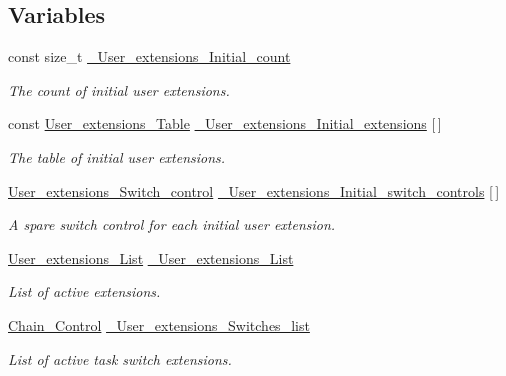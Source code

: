 \subsection*{Variables}
\begin{DoxyCompactItemize}
\item 
const size\+\_\+t \mbox{\hyperlink{group__RTEMSScoreUserExt_gae8c91b09bd26a5a7eae930202395a01b}{\+\_\+\+User\+\_\+extensions\+\_\+\+Initial\+\_\+count}}
\begin{DoxyCompactList}\small\item\em The count of initial user extensions. \end{DoxyCompactList}\item 
const \mbox{\hyperlink{structUser__extensions__Table}{User\+\_\+extensions\+\_\+\+Table}} \mbox{\hyperlink{group__RTEMSScoreUserExt_gafe277338e657c6fd563384012bc0e23c}{\+\_\+\+User\+\_\+extensions\+\_\+\+Initial\+\_\+extensions}} \mbox{[}$\,$\mbox{]}
\begin{DoxyCompactList}\small\item\em The table of initial user extensions. \end{DoxyCompactList}\item 
\mbox{\hyperlink{structUser__extensions__Switch__control}{User\+\_\+extensions\+\_\+\+Switch\+\_\+control}} \mbox{\hyperlink{group__RTEMSScoreUserExt_ga8a3af974c302d7af8bca9ecf85ac8149}{\+\_\+\+User\+\_\+extensions\+\_\+\+Initial\+\_\+switch\+\_\+controls}} \mbox{[}$\,$\mbox{]}
\begin{DoxyCompactList}\small\item\em A spare switch control for each initial user extension. \end{DoxyCompactList}\item 
\mbox{\label{group__RTEMSScoreUserExt_ga9630ab4d2e4630bc6de8982fe799642c}} 
\mbox{\hyperlink{structUser__extensions__List}{User\+\_\+extensions\+\_\+\+List}} \mbox{\hyperlink{group__RTEMSScoreUserExt_ga9630ab4d2e4630bc6de8982fe799642c}{\+\_\+\+User\+\_\+extensions\+\_\+\+List}}
\begin{DoxyCompactList}\small\item\em List of active extensions. \end{DoxyCompactList}\item 
\mbox{\label{group__RTEMSScoreUserExt_gaa15ba4f9aaebc886150a5736191be2f3}} 
\mbox{\hyperlink{unionChain__Control}{Chain\+\_\+\+Control}} \mbox{\hyperlink{group__RTEMSScoreUserExt_gaa15ba4f9aaebc886150a5736191be2f3}{\+\_\+\+User\+\_\+extensions\+\_\+\+Switches\+\_\+list}}
\begin{DoxyCompactList}\small\item\em List of active task switch extensions. \end{DoxyCompactList}\end{DoxyCompactItemize}
